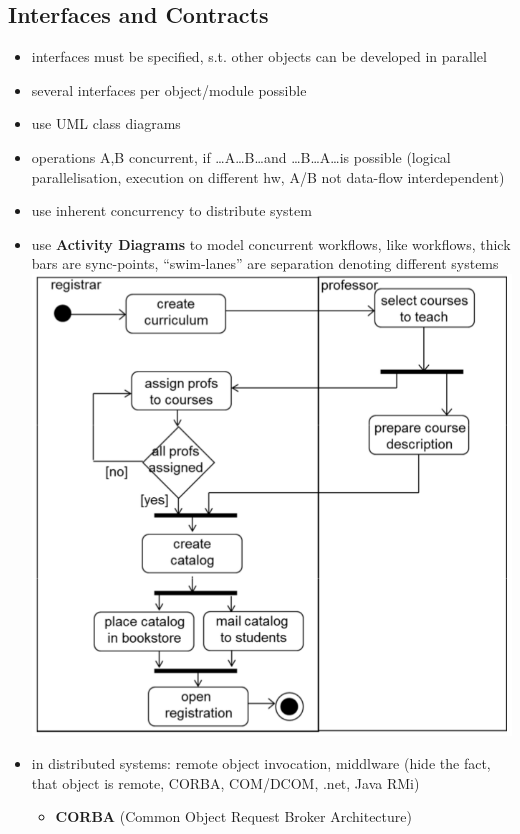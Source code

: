 \documentclass[a4paper, 10pt]{article}
\begin{document}
\subsection*{Interfaces and Contracts}
\begin{itemize}
	\item interfaces must be specified, s.t. other objects can be developed in parallel
	\item several interfaces per object/module possible
	\item use UML class diagrams
	\item operations A,B concurrent, if \dots A\dots B\dots and \dots B\dots A\dots is possible (logical parallelisation, execution on different hw, A/B not data-flow interdependent)
	\item use inherent concurrency to distribute system
	\item use \textbf{Activity Diagrams} to model concurrent workflows, like workflows, thick bars are sync-points, ``swim-lanes'' are separation denoting different systems \\
	\includegraphics[scale=0.4]{images/activity-diagram.png}
	\item in distributed systems: remote object invocation, middlware (hide the fact, that object is remote, CORBA, COM/DCOM, .net, Java RMi)
	\begin{itemize}
		\item \textbf{CORBA} (Common Object Request Broker Architecture)

\end{itemize}
\end{itemize}
\end{document}
